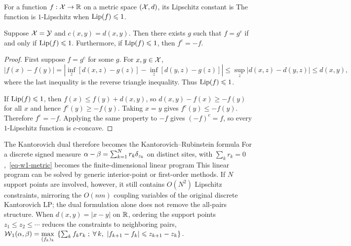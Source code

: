 \begin{defn}\label{def-lipschitz-constant}
For a function $f:\mathcal{X}\to\mathbb{R}$ on a metric space $(\mathcal{X},d)$, its Lipschitz constant is
The function is $1$-Lipschitz when $\operatorname{Lip}(f)\leqslant1$.
\end{defn}
\begin{prop}\label{prop-w1-c-transform-lipschitz}
Suppose $\mathcal{X}=\mathcal{Y}$ and $c(x,y)=d(x,y)$. Then there exists $g$ such that $f=g^c$ if and only if $\operatorname{Lip}(f)\leqslant1$. Furthermore, if $\operatorname{Lip}(f)\leqslant1$, then $f^c=-f$.
\end{prop}
\begin{proof}
First suppose $f=g^c$ for some $g$. For $x,y\in\mathcal{X}$,
\[
|f(x)-f(y)|
=
\left|\inf_z[d(x,z)-g(z)]-\inf_z[d(y,z)-g(z)]\right|
\leq
\sup_z |d(x,z)-d(y,z)|
\leq d(x,y),
\]
where the last inequality is the reverse triangle inequality. Thus $\operatorname{Lip}(f)\leqslant1$.

If $\operatorname{Lip}(f)\leqslant1$, then $f(x)\leq f(y)+d(x,y)$, so $d(x,y)-f(x)\geq -f(y)$ for all $x$ and hence $f^c(y)\geq -f(y)$. Taking $x=y$ gives $f^c(y)\leq -f(y)$. Therefore $f^c=-f$. Applying the same property to $-f$ gives $(-f)^c=f$, so every $1$-Lipschitz function is $c$-concave.
\end{proof}
The Kantorovich dual therefore becomes the Kantorovich--Rubinstein formula
For a discrete signed measure $\alpha-\beta=\sum_{k=1}^N r_k\delta_{z_k}$ on distinct sites, with $\sum_k r_k=0$,~\eqref{eq-w1-metric} becomes the finite-dimensional linear program
This linear program can be solved by generic interior-point or first-order methods. If $N$ support points are involved, however, it still contains $O(N^2)$ Lipschitz constraints, mirroring the $O(nm)$ coupling variables of the original discrete Kantorovich LP; the dual formulation alone does not remove the all-pairs structure. When $d(x,y)=|x-y|$ on $\mathbb{R}$, ordering the support points $z_1\leq z_2\leq\cdots$ reduces the constraints to neighboring pairs,
\(\operatorname{\mathcal{W}}_1(\alpha,\beta) = \underset{(f_k)_k}{\max}\; \left\{ \sum_k f_k r_k \;;\; \forall \, k,\ |f_{k+1}-f_k|\leqslant z_{k+1}-z_k \right\}.\)
